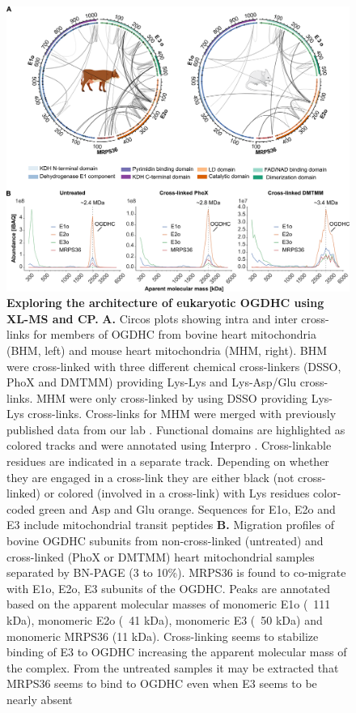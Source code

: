\begin{figure}[hbt!]
\centering
\includegraphics[width=\textwidth]{Chapter.5/Figures/Figure2.png}
\caption{\textbf{Exploring the architecture of eukaryotic OGDHC using XL-MS and CP.} \textbf{A.} Circos plots showing intra and inter cross-links for members of OGDHC from bovine heart mitochondria (BHM, left) and mouse heart mitochondria (MHM, right). BHM were cross-linked with three different chemical cross-linkers (DSSO, PhoX and DMTMM) providing Lys-Lys and Lys-Asp/Glu cross-links. MHM were only cross-linked by using DSSO providing Lys-Lys cross-links. Cross-links for MHM were merged with previously published data from our lab \cite{Liu_2018}. Functional domains are highlighted as colored tracks and were annotated using Interpro \cite{Blum_2021}. Cross-linkable residues are indicated in a separate track. Depending on whether they are engaged in a cross-link they are either black (not cross-linked) or colored (involved in a cross-link) with Lys residues color-coded green and Asp and Glu orange. Sequences for E1o, E2o and E3 include mitochondrial transit peptides \textbf{B.} Migration profiles of bovine OGDHC subunits from non-cross-linked (untreated) and cross-linked (PhoX or DMTMM) heart mitochondrial samples separated by BN-PAGE (3 to 10\%). MRPS36 is found to co-migrate with E1o, E2o, E3 subunits of the OGDHC. Peaks are annotated based on the apparent molecular masses of monomeric E1o (~111 kDa), monomeric E2o (~41 kDa), monomeric E3 (~50 kDa) and monomeric MRPS36 (11 kDa). Cross-linking seems to stabilize binding of E3 to OGDHC increasing the apparent molecular mass of the complex. From the untreated samples it may be extracted that MRPS36 seems to bind to OGDHC even when E3 seems to be nearly absent}
\label{fig:ch5_fig2}
\end{figure}

